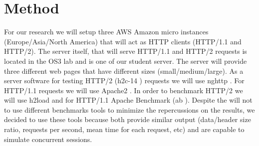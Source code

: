 \section{Method}
\label{method}
For our research we will setup three AWS Amazon  micro instances (Europe/Asia/North America) that will act as HTTP clients (HTTP/1.1 and HTTP/2). The server itself, that will serve HTTP/1.1 and HTTP/2 requests is located in the OS3 lab and is one of our student server. The server will provide three different web  pages that have different sizes (small/medium/large). As a server software for testing HTTP/2 (h2c-14 \cite{h2c-14}) requests we will use nghttp \cite{nghttp}. For HTTP/1.1 requests we will use Apache2 \cite{apache2}. In order to benchmark HTTP/2 we will use h2load \cite{h2load} and for HTTP/1.1 Apache Benchmark (ab \cite{ab}). Despite the will not to use different benchmarks tools to minimize the repercussions on the results, we decided to use these tools because both provide similar output (data/header size ratio, requests per second, mean time for each request, etc) and are capable to simulate concurrent sessions. 

